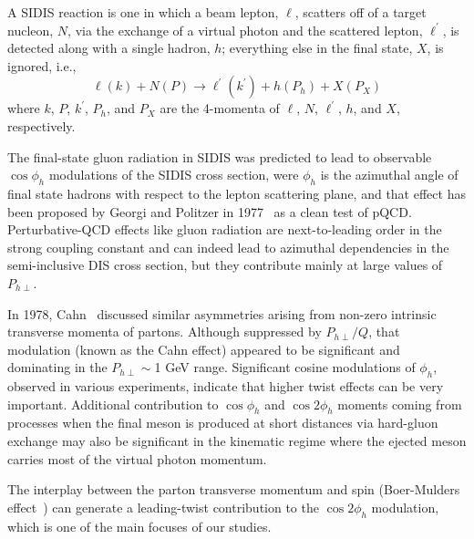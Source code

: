 \documentclass[aps,prl,twocolumn,showpacs,superscriptaddress,groupedaddress]{revtex4-1}  %
\newcommand{\Phperp}{P_{h\perp}}
\begin{document}
A SIDIS reaction is one in which a beam lepton, $\ell$, scatters off of a target nucleon, $N$, via the exchange of a virtual photon and the scattered lepton, $\ell^{\prime}$, is detected along with a single hadron, $h$; everything else in the final state, $X$, is ignored, i.e.,
\begin{equation}
\label{eq:sidis}
\ell (k) + N(P) \rightarrow \ell^{\prime} (k^{\prime} ) + h(P_{h}) + X(P_{X})
\end{equation}
where $k$, $P$, $k^{\prime}$, $P_{h}$, and $P_{X}$ are the 4-momenta of $\ell$, $N$, $\ell^{\prime}$, $h$, and $X$, respectively.

 The final-state gluon radiation in SIDIS  was predicted to lead to observable $\cos\phi_h$ modulations of the SIDIS cross section,
were $\phi_h$ is the azimuthal angle of final state hadrons with respect to the lepton scattering plane,
and that effect has been  proposed by Georgi and Politzer in  1977~\cite{Georgi:1977tv}  as a clean test of pQCD.
Perturbative-QCD effects like gluon radiation are next-to-leading order in the strong coupling constant and can indeed lead to azimuthal
dependencies in the semi-inclusive DIS cross section, but they contribute mainly at large values of $\Phperp$.

In 1978, Cahn~\cite{Cahn:1978se}   discussed  similar asymmetries arising from non-zero intrinsic transverse momenta of partons.
Although suppressed by $P_{h\perp}/Q$,  that modulation (known as the Cahn effect) appeared to be significant and dominating in the $P_{h\perp} \sim $1 GeV range.
Significant cosine modulations of $\phi_h$, observed in various experiments, indicate that higher twist effects can be very important.
Additional contribution to $\cos \phi_h$ and $\cos 2\phi_h$ moments coming from processes when the final meson
is produced at short distances via hard-gluon exchange \cite{Berger:1979xz} may also be 
significant in the kinematic regime where the ejected meson carries  most of 
the virtual photon momentum.

The interplay between the parton transverse momentum and spin
(Boer-Mulders effect~\cite{Boer:1997nt}) can generate a leading-twist
contribution to the $\cos 2\phi_h$ modulation, which is one of the main focuses of our studies.
\end{document}
